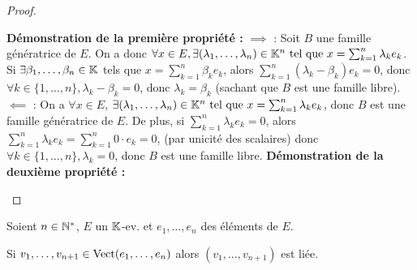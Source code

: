 \documentclass[12pt,a4paper]{report}
\begin{document}
\begin{proof}
    \begin{outline}
        \1 \textbf{Démonstration de la première propriété :}
            \2 $\implies$ : Soit $B$ une famille génératrice de $E$. On a donc $\forall x \in E, \exists (\lambda_1,\dots,\lambda_n) \in \mathbb{K}^n \text{ tel que } x = \sum_{k=1}^n \lambda_k e_k$. Si $\exists \beta_1,\dots,\beta_n \in \mathbb{K}$ tels que $x = \sum_{k=1}^n \beta_k e_k$, alors $\sum_{k=1}^n (\lambda_k - \beta_k) e_k = 0$, donc $\forall k \in \{1,\dots,n\}, \lambda_k - \beta_k = 0$, donc $\lambda_k = \beta_k$ (sachant que $B$ est une famille libre).
            \2 $\impliedby$ : On a $\forall x \in E$, $\exists (\lambda_1,\dots,\lambda_n) \in \mathbb{K}^n \text{ tel que } x = \sum_{k=1}^n \lambda_k e_k$, donc $B$ est une famille génératrice de $E$. De plus, si $\sum_{k=1}^n \lambda_k e_k = 0$, alors $\sum_{k=1}^n \lambda_k e_k = \sum_{k=1}^n 0 \cdot e_k = 0$, (par unicité des scalaires) donc $\forall k \in \{1,\dots,n\}, \lambda_k = 0$, donc $B$ est une famille libre.
        \1 \textbf{Démonstration de la deuxième propriété :}
            
    \end{outline}
\end{proof}

\begin{theorem}
    Soient $n \in \mathbb{N}^*$, $E$ un $\mathbb{K}$-ev. et $e_1,\dots,e_n$ des éléments de $E$.

    Si $v_1,\dots,v_{n+1} \in \mathrm{Vect}(e_1,\dots,e_n)$ alors $(v_1,\dots,v_{n+1})$ est liée.
\end{theorem}
\end{document}
